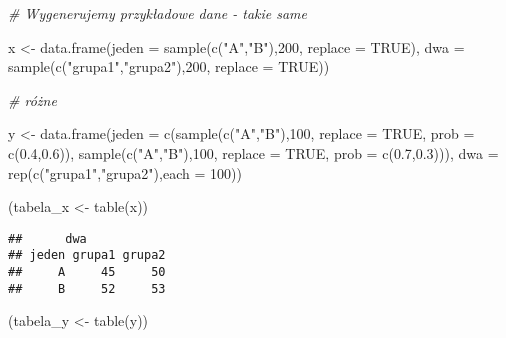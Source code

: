 \documentclass[
]{book}
\newenvironment{Shaded}{\begin{snugshade}}{\end{snugshade}}
\newcommand{\AttributeTok}[1]{\textcolor[rgb]{0.77,0.63,0.00}{#1}}
\newcommand{\CommentTok}[1]{\textcolor[rgb]{0.56,0.35,0.01}{\textit{#1}}}
\newcommand{\ConstantTok}[1]{\textcolor[rgb]{0.00,0.00,0.00}{#1}}
\newcommand{\DecValTok}[1]{\textcolor[rgb]{0.00,0.00,0.81}{#1}}
\newcommand{\FloatTok}[1]{\textcolor[rgb]{0.00,0.00,0.81}{#1}}
\newcommand{\FunctionTok}[1]{\textcolor[rgb]{0.00,0.00,0.00}{#1}}
\newcommand{\NormalTok}[1]{#1}
\newcommand{\OtherTok}[1]{\textcolor[rgb]{0.56,0.35,0.01}{#1}}
\newcommand{\StringTok}[1]{\textcolor[rgb]{0.31,0.60,0.02}{#1}}
\begin{document}
\begin{Shaded}
\begin{Highlighting}[]
\CommentTok{\# Wygenerujemy przykładowe dane {-} takie same}

\NormalTok{x }\OtherTok{\textless{}{-}} \FunctionTok{data.frame}\NormalTok{(}\AttributeTok{jeden  =}  \FunctionTok{sample}\NormalTok{(}\FunctionTok{c}\NormalTok{(}\StringTok{"A"}\NormalTok{,}\StringTok{"B"}\NormalTok{),}\DecValTok{200}\NormalTok{, }\AttributeTok{replace =} \ConstantTok{TRUE}\NormalTok{), }
                \AttributeTok{dwa  =}  \FunctionTok{sample}\NormalTok{(}\FunctionTok{c}\NormalTok{(}\StringTok{"grupa1"}\NormalTok{,}\StringTok{"grupa2"}\NormalTok{),}\DecValTok{200}\NormalTok{, }\AttributeTok{replace =} \ConstantTok{TRUE}\NormalTok{))}

\CommentTok{\# różne}

\NormalTok{y }\OtherTok{\textless{}{-}} \FunctionTok{data.frame}\NormalTok{(}\AttributeTok{jeden  =}  \FunctionTok{c}\NormalTok{(}\FunctionTok{sample}\NormalTok{(}\FunctionTok{c}\NormalTok{(}\StringTok{"A"}\NormalTok{,}\StringTok{"B"}\NormalTok{),}\DecValTok{100}\NormalTok{, }\AttributeTok{replace =} \ConstantTok{TRUE}\NormalTok{, }\AttributeTok{prob =} \FunctionTok{c}\NormalTok{(}\FloatTok{0.4}\NormalTok{,}\FloatTok{0.6}\NormalTok{)),}
                            \FunctionTok{sample}\NormalTok{(}\FunctionTok{c}\NormalTok{(}\StringTok{"A"}\NormalTok{,}\StringTok{"B"}\NormalTok{),}\DecValTok{100}\NormalTok{, }\AttributeTok{replace =} \ConstantTok{TRUE}\NormalTok{, }\AttributeTok{prob =} \FunctionTok{c}\NormalTok{(}\FloatTok{0.7}\NormalTok{,}\FloatTok{0.3}\NormalTok{))),}
                \AttributeTok{dwa  =}  \FunctionTok{rep}\NormalTok{(}\FunctionTok{c}\NormalTok{(}\StringTok{"grupa1"}\NormalTok{,}\StringTok{"grupa2"}\NormalTok{),}\AttributeTok{each =} \DecValTok{100}\NormalTok{))}

\NormalTok{(tabela\_x }\OtherTok{\textless{}{-}} \FunctionTok{table}\NormalTok{(x))}
\end{Highlighting}
\end{Shaded}

\begin{verbatim}
##      dwa
## jeden grupa1 grupa2
##     A     45     50
##     B     52     53
\end{verbatim}

\begin{Shaded}
\begin{Highlighting}[]
\NormalTok{(tabela\_y }\OtherTok{\textless{}{-}} \FunctionTok{table}\NormalTok{(y))}
\end{Highlighting}
\end{Shaded}
\end{document}
